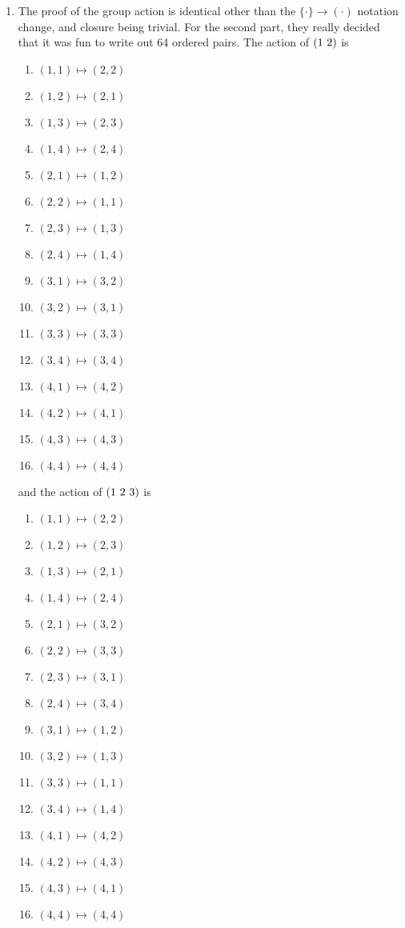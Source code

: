 \documentclass[]{article}
\newcommand*{\cycle}[1]{( \foreach \entry [count=\i] in {#1} {\ifnum\i>1\ \fi\entry})}
\begin{document}
\begin{enumerate}
\item The proof of the group action is identical other than the $\{\cdot\} \to (\cdot)$ notation change, and closure being trivial. For the second part, they really decided that it was fun to write out 64 ordered pairs. The action of $\cycle{1,2}$ is
\begin{enumerate}
\item $(1,1) \mapsto (2,2)$
\item $(1,2) \mapsto (2,1)$
\item $(1,3) \mapsto (2,3)$
\item $(1,4) \mapsto (2,4)$
\item $(2,1) \mapsto (1,2)$
\item $(2,2) \mapsto (1,1)$
\item $(2,3) \mapsto (1,3)$
\item $(2,4) \mapsto (1,4)$
\item $(3,1) \mapsto (3,2)$
\item $(3,2) \mapsto (3,1)$
\item $(3,3) \mapsto (3,3)$
\item $(3,4) \mapsto (3,4)$
\item $(4,1) \mapsto (4,2)$
\item $(4,2) \mapsto (4,1)$
\item $(4,3) \mapsto (4,3)$
\item $(4,4) \mapsto (4,4)$
\end{enumerate}
and the action of $\cycle{1,2,3}$ is
\begin{enumerate}
\item $(1,1) \mapsto (2,2)$
\item $(1,2) \mapsto (2,3)$
\item $(1,3) \mapsto (2,1)$
\item $(1,4) \mapsto (2,4)$
\item $(2,1) \mapsto (3,2)$
\item $(2,2) \mapsto (3,3)$
\item $(2,3) \mapsto (3,1)$
\item $(2,4) \mapsto (3,4)$
\item $(3,1) \mapsto (1,2)$
\item $(3,2) \mapsto (1,3)$
\item $(3,3) \mapsto (1,1)$
\item $(3,4) \mapsto (1,4)$
\item $(4,1) \mapsto (4,2)$
\item $(4,2) \mapsto (4,3)$
\item $(4,3) \mapsto (4,1)$
\item $(4,4) \mapsto (4,4)$
\end{enumerate}




\end{enumerate}
\end{document}
